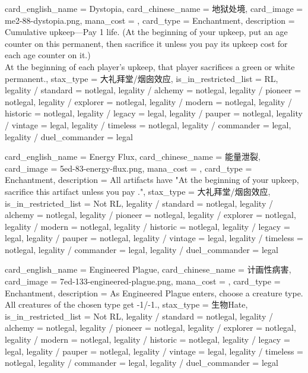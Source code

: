 \documentclass[lang = cn, color = black, 10pt]{AllThatStax}
\begin{document}
\card
{
	card_english_name = {Dystopia},
	card_chinese_name = {地狱处境},
	card_image = me2-88-dystopia.png,
	mana_cost = ,
	card_type = Enchantment,
	description = {Cumulative upkeep—Pay 1 life. (At the beginning of your upkeep, put an age counter on this permanent, then sacrifice it unless you pay its upkeep cost for each age counter on it.)\\
		At the beginning of each player's upkeep, that player sacrifices a green or white permanent.},
	stax_type = 大礼拜堂/烟囱效应,
	is_in_restricted_list = RL,
	legality / standard = notlegal,
	legality / alchemy = notlegal,
	legality / pioneer = notlegal,
	legality / explorer = notlegal,
	legality / modern = notlegal,
	legality / historic = notlegal,
	legality / legacy = legal,
	legality / pauper = notlegal,
	legality / vintage = legal,
	legality / timeless = notlegal,
	legality / commander = legal,
	legality / duel_commander = legal
}

\card
{
	card_english_name = {Energy Flux},
	card_chinese_name = {能量泄裂},
	card_image = 5ed-83-energy-flux.png,
	mana_cost = ,
	card_type = Enchantment,
	description = {All artifacts have "At the beginning of your upkeep, sacrifice this artifact unless you pay ."},
	stax_type = 大礼拜堂/烟囱效应,
	is_in_restricted_list = Not RL,
	legality / standard = notlegal,
	legality / alchemy = notlegal,
	legality / pioneer = notlegal,
	legality / explorer = notlegal,
	legality / modern = notlegal,
	legality / historic = notlegal,
	legality / legacy = legal,
	legality / pauper = notlegal,
	legality / vintage = legal,
	legality / timeless = notlegal,
	legality / commander = legal,
	legality / duel_commander = legal
}

\card
{
	card_english_name = {Engineered Plague},
	card_chinese_name = {计画性病害},
	card_image = 7ed-133-engineered-plague.png,
	mana_cost = ,
	card_type = Enchantment,
	description = {As Engineered Plague enters, choose a creature type.\\
		All creatures of the chosen type get -1/-1.},
	stax_type = 生物Hate,
	is_in_restricted_list = Not RL,
	legality / standard = notlegal,
	legality / alchemy = notlegal,
	legality / pioneer = notlegal,
	legality / explorer = notlegal,
	legality / modern = notlegal,
	legality / historic = notlegal,
	legality / legacy = legal,
	legality / pauper = notlegal,
	legality / vintage = legal,
	legality / timeless = notlegal,
	legality / commander = legal,
	legality / duel_commander = legal
}
\end{document}

